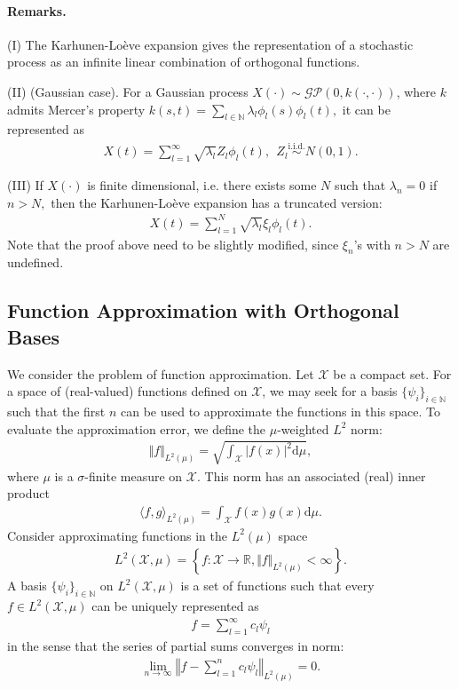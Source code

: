 \documentclass{article}
\begin{document}
\paragraph{Remarks.} (I) The Karhunen-Loève expansion gives the representation of a stochastic process as an infinite linear combination of orthogonal functions. \vspace{0.1cm}

(II) (Gaussian case). For a Gaussian process $X(\cdot)\sim\mathcal{GP}(0,k(\cdot,\cdot))$, where $k$ admits Mercer's property $k(s,t)=\sum_{l\in\mathbb{N}}\lambda_l\phi_l(s)\phi_l(t),$ it can be represented as
\begin{align*}
	X(t) = \sum_{l=1}^\infty\sqrt{\lambda_l}Z_l\phi_l(t),\ \ Z_l\overset{\mathrm{i.i.d.}}{\sim} N(0,1).\tag{7.12}
\end{align*}

(III) If $X(\cdot)$ is finite dimensional, i.e. there exists some $N$ such that $\lambda_n = 0$ if $n>N,$ then the Karhunen-Loève expansion has a truncated version:
\begin{align*}
	X(t) = \sum_{l=1}^N\sqrt{\lambda_l}\xi_l\phi_l(t).\tag{7.13}
\end{align*}
Note that the proof above need to be slightly modified, since $\xi_n$'s with $n > N$ are undefined.

\subsection{Function Approximation with Orthogonal Bases}
We consider the problem of function approximation. Let $\mathcal{X}$ be a compact set. For a space of (real-valued) functions defined on $\mathcal{X}$, we may seek for a basis $\lbrace \psi_i\rbrace_{i\in\mathbb{N}}$ such that the first $n$ can be used to approximate the functions in this space. To evaluate the approximation error, we define the $\mu$-weighted $L^2$ norm:
\begin{align*}
	\Vert f\Vert_{L^2(\mu)} = \sqrt{\int_\mathcal{X} \vert f(x)\vert^2\mathrm{d}\mu},\tag{7.14}
\end{align*}
where $\mu$ is a $\sigma$-finite measure on $\mathcal{X}.$ This norm has an associated (real) inner product
\begin{align*}
	\langle f,g\rangle_{L^2(\mu)} = \int_\mathcal{X} f(x)g(x)\mathrm{d}\mu.\tag{7.15}
\end{align*}
Consider approximating functions in the $L^2(\mu)$ space
\begin{align*}
	L^2(\mathcal{X},\mu) = \left\lbrace f:\mathcal{X}\to\mathbb{R}, \Vert f\Vert_{L^2(\mu)} < \infty\right\rbrace.\tag{7.16}
\end{align*}
A basis $\lbrace \psi_i\rbrace_{i\in\mathbb{N}}$ on $L^2(\mathcal{X},\mu)$ is a set of functions such that every $f\in L^2(\mathcal{X},\mu)$ can be uniquely represented as
\begin{align*}
	f=\sum_{l=1}^\infty c_l\psi_l\tag{7.17}
\end{align*}
in the sense that the series of partial sums converges in norm:
\begin{align*}
	\lim_{n\to\infty}\left\Vert f - \sum_{l=1}^n c_l\psi_l\right\Vert_{L^2(\mu)} = 0.\tag{7.18}
\end{align*}
\end{document}
